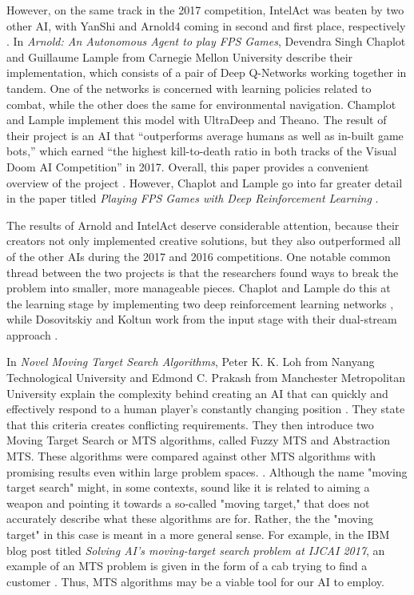 However, on the same track in the 2017 competition, IntelAct was beaten by two other AI, with YanShi and Arnold4 coming in second and first place, respectively \cite{VDComp:2017}. In {\it Arnold: An Autonomous Agent to play FPS Games}, Devendra Singh Chaplot and Guillaume Lample from Carnegie Mellon University describe their implementation, which consists of a pair of Deep Q-Networks working together in tandem. One of the networks is concerned with learning policies related to combat, while the other does the same for environmental navigation. Champlot and Lample implement this model with UltraDeep and Theano. The result of their project is an AI that ``outperforms average humans as well as in-built game bots,'' which earned ``the highest kill-to-death ratio in both tracks of the Visual Doom AI Competition'' in 2017. Overall, this paper provides a convenient overview of the project \cite{Chaplot}. However, Chaplot and Lample go into far greater detail in the paper titled {\it Playing FPS Games with Deep Reinforcement Learning} \cite{Chaplot:2016}.

The results of Arnold and IntelAct deserve considerable attention, because their creators not only implemented creative solutions, but they also outperformed all of the other AIs during the 2017 and 2016 competitions. One notable common thread between the two projects is that the researchers found ways to break the problem into smaller, more manageable pieces. Chaplot and Lample do this at the learning stage by implementing two deep reinforcement learning networks \cite{Chaplot}, while Dosovitskiy and Koltun work from the input stage with their dual-stream approach \cite{Dosovitskiy:2016}.

In {\it Novel Moving Target Search Algorithms}, Peter K. K. Loh from Nanyang Technological University and Edmond C. Prakash from Manchester Metropolitan University explain the complexity behind creating an AI that can quickly and effectively respond to a human player's constantly changing position \cite{Loh:2009}. They state that this criteria creates conflicting requirements. They then introduce two Moving Target Search or MTS algorithms, called Fuzzy MTS and Abstraction MTS. These algorithms were compared against other MTS algorithms with promising results even within large problem spaces. \cite{Loh:2009}. Although the name "moving target search" might, in some contexts, sound like it is related to aiming a weapon and pointing it towards a so-called "moving target," that does not accurately describe what these algorithms are for. Rather, the the "moving target" in this case is meant in a more general sense. For example, in the IBM blog post titled {\it Solving AI’s moving-target search problem at IJCAI 2017}, an example of an MTS problem is given in the form of a cab trying to find a customer \cite{IBM:2017}. Thus, MTS algorithms may be a viable tool for our AI to employ.

